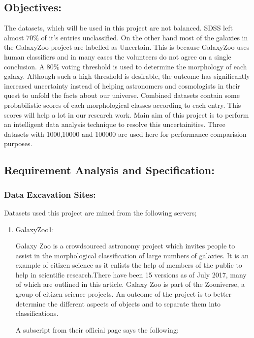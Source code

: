 \documentclass[11pt]{article}
\providecommand{\tightlist}{%
      \setlength{\itemsep}{0pt}\setlength{\parskip}{0pt}}
\begin{document}
    \subsection{Objectives:}\label{objectives}

The datasets, which will be used in this project are not balanced. SDSS
left almost 70\% of it's entries unclassified. On the other hand most of
the galaxies in the GalaxyZoo project are labelled as Uncertain. This is
because GalaxyZoo uses human classifiers and in many cases the
volunteers do not agree on a single conclusion. A 80\% voting threshold
is used to determine the morphology of each galaxy. Although such a high
threshold is desirable, the outcome has significantly increased
uncertainty instead of helping astronomers and cosmologists in their
quest to unfold the facts about our universe. Combined datasets contain
some probabilistic scores of each morphological classes according to
each entry. This scores will help a lot in our research work. Main aim
of this project is to perform an intelligent data analysis technique to
resolve this uncertainities. Three datasets with 1000,10000 and 100000
are used here for performance comparision purposes.

    \subsection{Requirement Analysis and
Specification:}\label{requirement-analysis-and-specification}

\subsubsection{Data Excavation Sites:}\label{data-excavation-sites}

Datasets used this project are mined from the following servers;

\begin{enumerate}
\def\labelenumi{\arabic{enumi}.}
\tightlist
\item
  GalaxyZoo1:

  Galaxy Zoo is a crowdsourced astronomy project which invites people to
  assist in the morphological classification of large numbers of
  galaxies. It is an example of citizen science as it enlists the help
  of members of the public to help in scientific research.There have
  been 15 versions as of July 2017, many of which are outlined in this
  article. Galaxy Zoo is part of the Zooniverse, a group of citizen
  science projects. An outcome of the project is to better determine the
  different aspects of objects and to separate them into
  classifications.

  A subscript from their official page says the following:
\end{enumerate}
\end{document}
